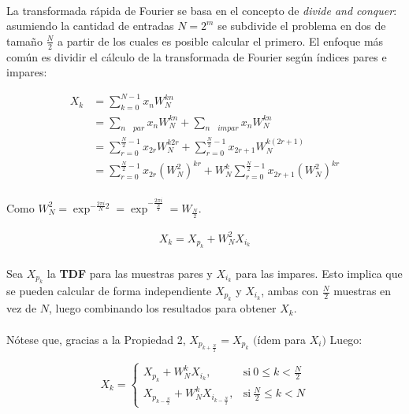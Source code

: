 \documentclass[12pt, twocolumn]{article}
\begin{document}
	\paragraph{} La transformada rápida de Fourier se basa en el concepto de \textit{divide and conquer}: asumiendo la cantidad de entradas $N = 2^{m}$ se subdivide el problema en dos de tamaño $\frac{N}{2}$ a partir de los cuales es posible calcular el primero. El enfoque más común es dividir el cálculo de la transformada de Fourier según índices pares e impares:
	
	\begin{align}
		X_{k} &= \sum_{k=0}^{N-1} x_{n}W_{N}^{kn} \\
		&= \sum_{n\quad par}x_{n}W_{N}^{kn} + \sum_{n\quad impar}x_{n}W_{N}^{kn} \\
		&= \sum_{r=0}^{\frac{N}{2}-1} x_{2r}W_{N}^{k2r} + \sum_{r=0}^{\frac{N}{2}-1}x_{2r+1}W_{N}^{k(2r+1)} \\
		&= \sum_{r=0}^{\frac{N}{2}-1}x_{2r}(W_{N}^{2})^{kr} + W_{N}^{k}\sum_{r=0}^{\frac{N}{2}-1}x_{2r+1}(W_{N}^{2})^{kr}
	\end{align}
	
	\paragraph{} Como $W_{N}^{2} = \exp^{-\frac{2\pi i}{N}2} = \exp^{-\frac{2\pi i}{\frac{N}{2}}} = W_{\frac{N}{2}}$.
	
	\begin{align}
		X_{k} = X_{p_{k}} + W_{N}^{2}X_{i_{k}}
	\end{align}
	
	\paragraph{} Sea $X_{p_{k}}$ la \textbf{TDF} para las muestras pares y $X_{i_{k}}$ para las impares. Esto implica que se pueden calcular de forma independiente $X_{p_{k}}$ y $X_{i_{k}}$, ambas con $\frac{N}{2}$ muestras en vez de $N$, luego combinando los resultados para obtener $X_{k}$.
	
	\paragraph{} Nótese que, gracias a la Propiedad 2, $X_{p_{k+\frac{N}{2}}} = X_{p_{k}}$ $($ídem para $X_{i})$ Luego:
	
	\begin{equation}
	X_{k}=
	\begin{cases}
	X_{p_{k}}+W_{N}^{k}X_{i_{k}}, & \text{si}\ 0\le k< \frac{N}{2} \\
	X_{p_{k-\frac{N}{2}}}+W_{N}^{k}X_{i_{k-\frac{N}{2}}}, & \text{si}\ \frac{N}{2}\le k < N
	\end{cases}
	\end{equation}
	
\end{document}
